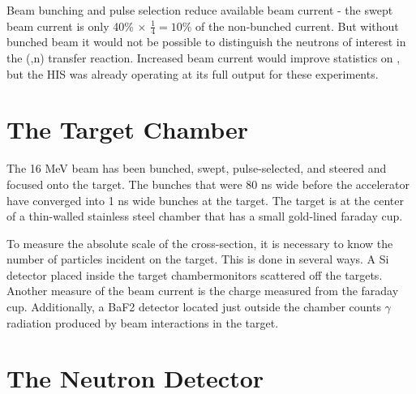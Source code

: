 
Beam bunching and pulse selection reduce available beam current - the swept beam current is only 40\% $\times$ $\frac{1}{4} = 10$\% of the non-bunched current.  But without bunched beam it would not be possible to distinguish the neutrons of interest in the (,n) transfer reaction.  Increased beam current would improve statistics on \reaction, but the HIS was already operating at its full output for these experiments.

\section{The Target Chamber}

The 16 MeV  beam has been bunched, swept, pulse-selected, and steered and focused onto the target.  The bunches that were 80 ns wide before the accelerator have converged into 1 ns wide bunches at the target.  The target is at the center of a thin-walled stainless steel chamber that has a small gold-lined faraday cup.   

To measure the absolute scale of the cross-section, it is necessary to know the number of particles incident on the target.  This is done in several ways.  A Si detector placed inside the target chambermonitors  scattered off the targets.  Another measure of the beam current is the charge measured from the faraday cup.  Additionally, a BaF2 detector located just outside the chamber counts $\gamma$ radiation produced by beam interactions in the target.  


\section{The Neutron Detector}

